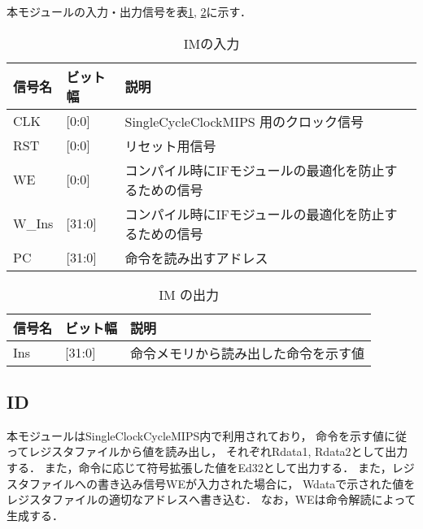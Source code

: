 本モジュールの入力・出力信号を表\ref{tab:im_input}, \ref{tab:im_output}に示す．
\begin{table}[h]
  \caption{IMの入力}
  \centering
  \begin{tabular}{l|l|l}
    信号名 & ビット幅 & 説明 \\
    \hline
    CLK & [0:0] & SingleCycleClockMIPS 用のクロック信号 \\
    RST & [0:0] & リセット用信号 \\
    WE & [0:0] & コンパイル時にIFモジュールの最適化を防止するための信号 \\
    W\_Ins & [31:0] & コンパイル時にIFモジュールの最適化を防止するための信号 \\
    PC & [31:0] & 命令を読み出すアドレス \\
  \end{tabular}
  \label{tab:im_input}
\end{table}
\begin{table}[h]
  \caption{IM の出力}
  \centering
  \begin{tabular}{l|l|l}
    信号名 & ビット幅 & 説明 \\
    \hline
    Ins & [31:0] & 命令メモリから読み出した命令を示す値 \\
  \end{tabular}
  \label{tab:im_output}
\end{table}


\subsection{ID}
本モジュールはSingleClockCycleMIPS内で利用されており，
命令を示す値に従ってレジスタファイルから値を読み出し，
それぞれRdata1, Rdata2として出力する．
また，命令に応じて符号拡張した値をEd32として出力する．
また，レジスタファイルへの書き込み信号WEが入力された場合に，
Wdataで示された値をレジスタファイルの適切なアドレスへ書き込む．
なお，WEは命令解読によって生成する．

